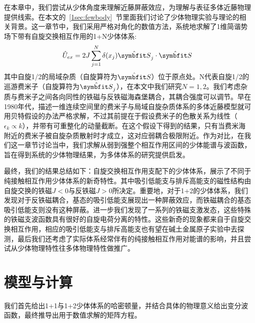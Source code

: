 在本章中，我们尝试从少体角度来理解近藤屏蔽效应，为理解与表征多体近藤物理提供线索。在本文的~\ref{1sec:fewbody}~节里面我们讨论了少体物理实验与理论的相关背景。这一章节中，我们采用严格对角化的数值方法，系统地求解了1维简谐势场下带有自旋交换相互作用的1+N少体体系:
\begin{equation}\label{eq:sp-ex}
    \hat{U}_{ex} = 2J\sum_{j=1}^{N} \delta(x_j) \hat{\Vector{S}}_j\cdot\hat{\Vector{S}}
\end{equation}
其中自旋1/2的局域杂质（自旋算符为$\hat{\Vector{S}}$）位于原点处。N代表自旋1/2的巡游费米子（自旋算符为$\hat{\Vector{S}}_j$），在本文中我们研究$N=1,2$。我们考虑杂质与费米子之间各向同性的铁磁与反铁磁海森堡耦合，其耦合强度可以调节。早在1980年代，描述一维连续空间里的费米子与局域自旋杂质体系的多体近藤模型就可用贝特假设的办法严格求解\cite{andrei1983solution}，不过其前提在于假设费米子的色散关系为线性（$\epsilon_k\propto k$），并带有可重整化的动量截断。在这个假设下得到的结果，只有当费米海附近的费米子被自旋杂质散射时才成立，这对应弱耦合极限附近。作为对比，在我们这一章节讨论当中，我们求解从弱到强整个相互作用区间的少体能谱与波函数，旨在得到系统的少体物理结果，为多体体系的研究提供启发。


最终，我们的结果总结如下：自旋交换相互作用支配下的少体体系，展示了不同于纯接触相互作用少体体系的新奇特性。其中吸引低能支与排斥高能支的磁性结构由自旋交换的铁磁$J<0$与反铁磁$J>0$所决定。重要地，对于1+2的少体体系，我们发现对于反铁磁耦合，基态的吸引低能支展现出一种屏蔽效应，而铁磁耦合的基态吸引低能支则没有这种屏蔽。进一步我们发现了一系列的铁磁支激发态，这些特殊的铁磁支波函数具有很好的自旋电荷分离的特性。这些新奇的现象都来自于自旋交换相互作用，相应的吸引低能支与排斥高能支也有望在碱土金属原子实验中去探测，最后我们还考虑了实际体系经常伴有的纯接触相互作用对能谱的影响，并且尝试从少体物理特性往多体物理特性做推广。

\section{模型与计算}\label{2sec:spex-model}
我们首先给出1+1与1+2少体体系的哈密顿量，并结合具体的物理意义给出变分波函数，最终推导出用于数值求解的矩阵方程。
